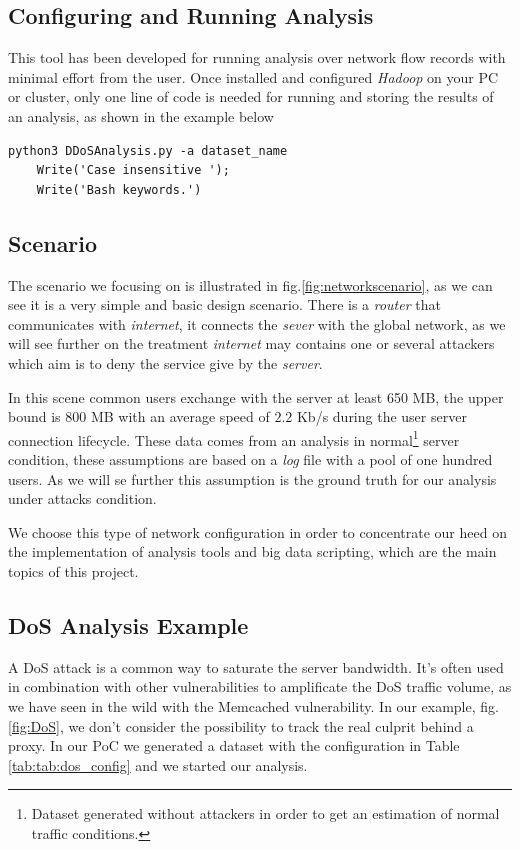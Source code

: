 \subsection{Configuring and Running Analysis}
This tool has been developed for running analysis over network flow records with minimal effort from the user. Once installed and configured \textit{Hadoop} on your PC or cluster, only one line of code is needed for running and storing the results of an analysis, as shown in the example below

\begin{lstlisting}[firstline=1, lastline=1]
   python3 DDoSAnalysis.py -a dataset_name
	Write('Case insensitive '); 
	Write('Bash keywords.')
\end{lstlisting}

\subsection{Scenario} 
The scenario we focusing on is illustrated in fig.\ref{fig:networkscenario}, as we can see it is a very simple and basic design scenario. There is a \textit{router} that communicates with \textit{internet},  it connects the \textit{sever} with the global network, as we will see further on the treatment \textit{internet} may contains one or several attackers which aim is to deny the service give by the \textit{server}. 

In this scene common users exchange with the server at least 650 MB, the upper bound is $800$ MB with an average speed of $2.2$ Kb/s during the user server connection lifecycle. These data comes from an analysis in normal\footnote{Dataset generated without attackers in order to get an estimation of normal traffic conditions.} server condition, these assumptions are based on a \textit{log} file with a pool of one hundred users. As we will se further this assumption is the ground truth for our analysis under attacks condition.

We choose this type of network configuration in order to concentrate our heed on the implementation of analysis tools and big data scripting, which are the main topics of this project.
  
\subsection{DoS Analysis Example}
A DoS attack is a common way to saturate the server bandwidth. It's often used in combination with other vulnerabilities to amplificate the DoS traffic volume, as we have seen in the wild with the Memcached vulnerability\cite{memcached_vulnerability}. In our example, fig. \ref{fig:DoS}, we don't consider the possibility to track the real culprit behind a proxy.
In our PoC we generated a dataset with the configuration in Table \ref{tab:tab:dos_config} and we started our analysis.

